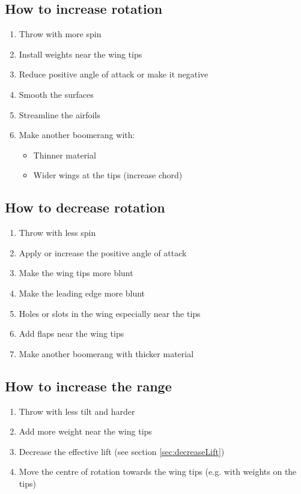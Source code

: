 \subsection{How to increase rotation}
\begin{enumerate}
\item Throw with more spin 
\item Install weights near the wing tips
\item Reduce positive angle of attack or make it negative
\item Smooth the surfaces
\item Streamline the airfoils
\item Make another boomerang with:
	\begin{itemize}
	\item Thinner material
	\item Wider wings at the tips (increase chord)
\end{itemize}
\end{enumerate}

\subsection{How to decrease rotation}
\begin{enumerate}
\item Throw with less spin 
\item Apply or increase the positive angle of attack
\item Make the wing tips more blunt
\item Make the leading edge more blunt
\item Holes or slots in the wing especially near the tips
\item Add flaps near the wing tips
\item Make another boomerang with thicker material 
\end{enumerate}

\subsection{How to increase the range}
\begin{enumerate}
\item Throw with less tilt and harder
\item Add more weight near the wing tips
\item Decrease the effective lift (see section \ref{sec:decreaseLift}) 
\item Move the centre of rotation towards the wing tips (e.g. with weights on the tips)
\end{enumerate}

